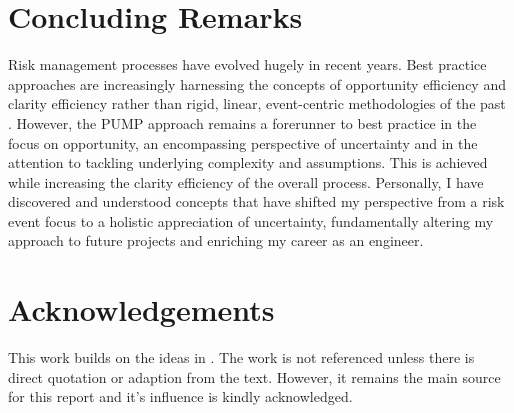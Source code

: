 \documentclass{ecsarticle}     %
\begin{document}

\mainmatter




\section{Concluding Remarks}
Risk management processes have evolved hugely in recent years.
Best practice approaches are increasingly harnessing the concepts of opportunity efficiency and clarity efficiency rather than rigid, linear, event-centric methodologies of the past \citep{association2012}.
However, the PUMP approach remains a forerunner to best practice in the focus on opportunity, an encompassing perspective of uncertainty and in the attention to tackling underlying complexity and assumptions.
This is achieved while increasing the clarity efficiency of the overall process.
Personally, I have discovered and understood concepts that have shifted my perspective from a risk event focus to a holistic appreciation of uncertainty, fundamentally altering my approach to future projects and enriching my career as an engineer.
\backmatter




\appendix
\appendixpage
\appendixheaderon
%
\section{Acknowledgements}
This work builds on the ideas in \cite{chapman}. The work is not referenced unless there is direct quotation or adaption from the text. However, it remains the main source for this report and it's influence is kindly acknowledged.
\end{document}
